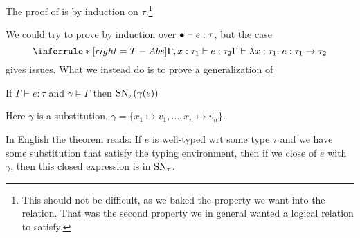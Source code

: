 The proof of  is by induction on $\tau$.\footnote{This should not be difficult, as we baked the property we want into the relation. That was the second property we in general wanted a logical relation to satisfy.}

We could try to prove  by induction over $\bullet \vdash e : \tau$, but the case
\[
  \TAbs
\]
gives issues. What we instead do is to prove a generalization of 
\begin{astrnorm}
  If $\Gamma \vdash e : \tau$ and $\gamma \models \Gamma$ then $\operatorname{SN}_{\tau}(\gamma(e))$
\end{astrnorm}
Here $\gamma$ is a substitution, $\gamma = \{x_1 \mapsto v_1, \dots , x_n \mapsto v_n\}$.

In English the theorem reads: If $e$ is well-typed wrt some type $\tau$ and we have some substitution that satisfy the typing environment, then if we close of $e$ with $\gamma$, then this closed expression is in $\operatorname{SN}_\tau$.

